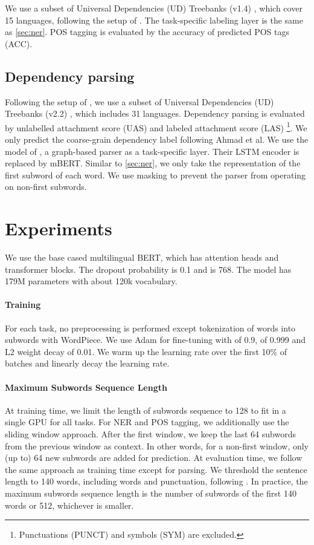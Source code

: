 \documentclass[11pt,a4paper]{article}
\begin{document}
We use a subset of Universal Dependencies (UD) Treebanks (v1.4) \cite{ud1.4}, which cover 15 languages, following the setup of . The task-specific labeling layer is the same as \cref{sec:ner}. POS tagging is evaluated by the accuracy of predicted POS tags (ACC).

\subsection{Dependency parsing}

Following the setup of , we use a subset of Universal Dependencies (UD) Treebanks (v2.2) \cite{ud2.2}, which includes 31 languages. Dependency parsing is evaluated by unlabelled attachment score (UAS) and labeled attachment score (LAS) \footnote{Punctuations (PUNCT) and symbols (SYM) are excluded.}. We only predict the coarse-grain dependency label following Ahmad et al. We use the model of , a graph-based parser as a task-specific layer. Their LSTM encoder is replaced by mBERT. Similar to \cref{sec:ner}, we only take the representation of the first subword of each word. We use masking to prevent the parser from operating on non-first subwords.


\section{Experiments}

We use the base cased multilingual BERT, which has  attention heads and  transformer blocks. The dropout probability is 0.1 and  is 768. The model has 179M parameters with about 120k vocabulary.

\paragraph{Training} For each task, no preprocessing is performed except tokenization of words into subwords with WordPiece. We use Adam \cite{kingma2014adam} for fine-tuning with  of 0.9,  of 0.999 and L2 weight decay of 0.01. We warm up the learning rate over the first 10\% of batches and linearly decay the learning rate.

\paragraph{Maximum Subwords Sequence Length} At training time, we limit the length of subwords sequence to 128 to fit in a single GPU for all tasks. For NER and POS tagging, we additionally use the sliding window approach. After the first window, we keep the last 64 subwords from the previous window as context. In other words, for a non-first window, only (up to) 64 new subwords are added for prediction. At evaluation time, we follow the same approach as training time except for parsing. We threshold the sentence length to 140 words, including words and punctuation, following . In practice, the maximum subwords sequence length is the number of subwords of the first 140 words or 512, whichever is smaller.
\end{document}
